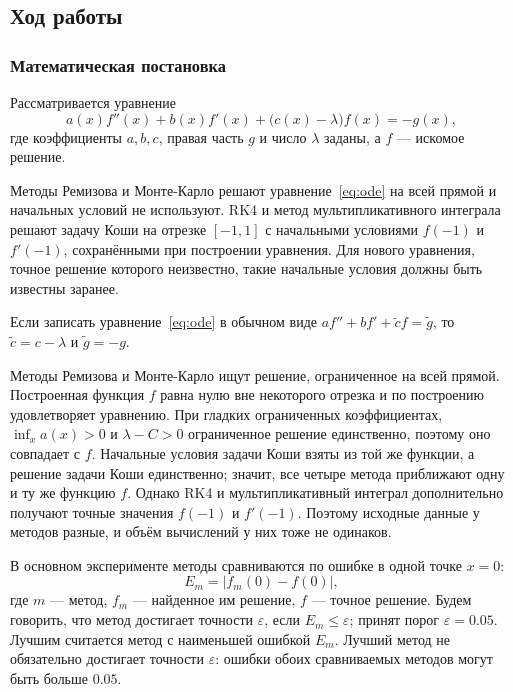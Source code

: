 \documentclass[14pt,a4paper]{extarticle}
\begin{document}
\subsection{Ход работы}
\subsubsection{Математическая постановка}
Рассматривается уравнение
\begin{equation}\label{eq:ode}
a(x)f''(x)+b(x)f'(x)+\bigl(c(x)-\lambda\bigr)f(x)=-g(x),
\end{equation}
где коэффициенты $a,b,c$, правая часть $g$ и число $\lambda$ заданы,
а $f$ --- искомое решение.

Методы Ремизова и Монте-Карло решают уравнение~\eqref{eq:ode} на всей
прямой и начальных условий не используют. RK4 и метод мультипликативного
интеграла решают задачу Коши на отрезке $[-1,1]$ с начальными условиями
$f(-1)$ и $f'(-1)$, сохранёнными при построении уравнения. Для нового
уравнения, точное решение которого неизвестно, такие начальные условия
должны быть известны заранее.

Если записать уравнение~\eqref{eq:ode} в обычном виде
$af''+bf'+\tilde c f=\tilde g$, то $\tilde c=c-\lambda$
и $\tilde g=-g$.

Методы Ремизова и Монте-Карло ищут решение, ограниченное на всей
прямой. Построенная функция $f$ равна нулю вне некоторого отрезка
и по построению удовлетворяет уравнению. При гладких ограниченных
коэффициентах, $\inf_x a(x)>0$ и $\lambda-C>0$ ограниченное решение
единственно, поэтому оно совпадает с $f$. Начальные условия задачи
Коши взяты из той же функции, а решение задачи Коши единственно;
значит, все четыре метода приближают одну и ту же функцию $f$. Однако
RK4 и мультипликативный интеграл дополнительно получают точные значения
$f(-1)$ и $f'(-1)$. Поэтому исходные данные у методов разные, и объём
вычислений у них тоже не одинаков.

В основном эксперименте методы сравниваются по ошибке в одной точке $x=0$:
\begin{equation}\label{eq:ml-error}
E_m=\bigl|f_m(0)-f(0)\bigr|,
\end{equation}
где $m$ --- метод, $f_m$ --- найденное им решение, $f$ --- точное
решение. Будем говорить, что метод достигает точности $\varepsilon$,
если $E_m\le\varepsilon$; принят порог $\varepsilon=0.05$. Лучшим считается
метод с наименьшей ошибкой $E_m$. Лучший метод не обязательно достигает
точности $\varepsilon$: ошибки обоих сравниваемых методов могут быть
больше $0.05$.
\end{document}
